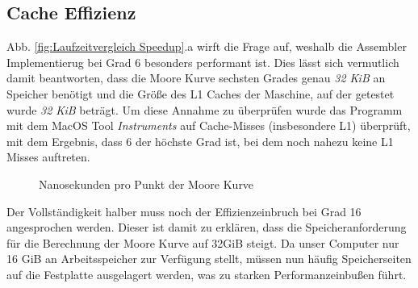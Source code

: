 \documentclass[course=erap]{aspdoc}
\begin{document}
\subsection{Cache Effizienz}
Abb. \ref{fig:Laufzeitvergleich Speedup}.a wirft die Frage auf, weshalb die Assembler Implementierug bei Grad 6 besonders performant ist. Dies lässt sich vermutlich damit beantworten, dass die Moore Kurve sechsten Grades genau \textit{32 KiB} an Speicher benötigt und die Größe des L1 Caches der Maschine, auf der getestet wurde \textit{32 KiB} beträgt. Um diese Annahme zu überprüfen wurde das Programm mit dem MacOS Tool \textit{Instruments} auf Cache-Misses (insbesondere L1) überprüft, mit dem Ergebnis, dass 6 der höchste Grad ist, bei dem noch nahezu keine L1 Misses auftreten.

\begin{figure}[h] 
    \centering
    \qquad
    \caption{Nanosekunden pro Punkt der Moore Kurve}%
    \label{fig:Laufzeitvergleich Skaliert}%
 \end{figure}
 
 Der Vollständigkeit halber muss noch der Effizienzeinbruch bei Grad 16 angesprochen werden. Dieser ist damit zu erklären, dass die Speicheranforderung für die Berechnung der Moore Kurve auf 32GiB steigt. Da unser Computer nur 16 GiB an Arbeitsspeicher zur Verfügung stellt, müssen nun häufig Speicherseiten auf die Festplatte ausgelagert werden, was zu starken Performanzeinbußen führt.


\FloatBarrier
\end{document}
